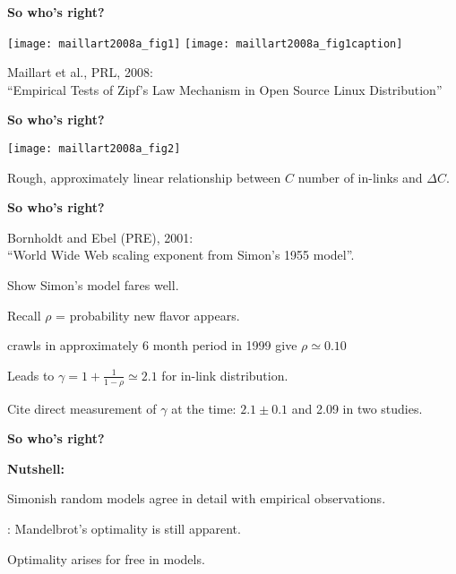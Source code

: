   \textbf{So who's right?}

  
  \texttt{[image: maillart2008a\_fig1]}
  \texttt{[image: maillart2008a\_fig1caption]}
  
  \bigskip

  Maillart et al., PRL, 2008:\\
  ``Empirical Tests of {Z}ipf's Law Mechanism in 
  Open Source {L}inux Distribution''\cite{maillart2008a}
  
  

  \textbf{So who's right?}

  
    \texttt{[image: maillart2008a\_fig2]}
    
    
     
      Rough, approximately linear relationship
      between $C$ number of in-links and $\Delta C$.
    
  


  \textbf{So who's right?}

  
  Bornholdt and Ebel (PRE), 2001:\\
  ``World {W}ide {W}eb scaling exponent from {S}imon's 1955 model''\cite{bornholdt2001a}.

  
  
    Show Simon's model fares well.
  
    Recall $\rho$ = probability new flavor appears.
  
     crawls in approximately 6 month period in 1999
    give $\rho \simeq 0.10$
  
    Leads to $\gamma = 1 + \frac{1}{1-\rho} \simeq 2.1$ for in-link distribution.
  
    Cite direct measurement of $\gamma$ at the time: $2.1 \pm 0.1$ and 2.09
    in two studies.
  
  


  \textbf{So who's right?}

  \textbf{Nutshell:}
    
    
      Simonish random  models
      agree in detail with empirical observations.
    
      : Mandelbrot's optimality is still apparent.
    
      Optimality arises for free in
       models.
    
  



